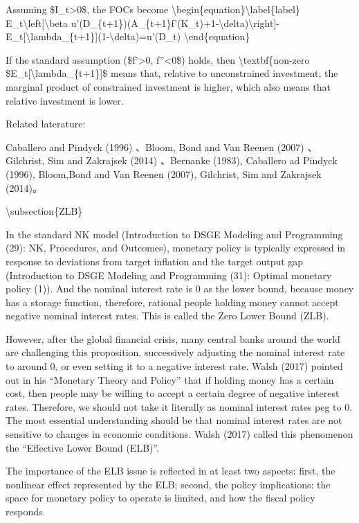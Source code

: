 \documentclass[10pt,math=newtx,citestyle=gb7714-2015,bibstyle=gb7714-2015]{elegantbook}
\begin{document}
	Assuming \$I\_t>0\$, the FOCs become
	\textbackslash{}begin\{equation\}\textbackslash{}label\{label\}
	E\_t\textbackslash{}left[\textbackslash{}beta u'(D\_\{t+1\})(A\_\{t+1\}f'(K\_t)+1-\textbackslash{}delta)\textbackslash{}right]-E\_t[\textbackslash{}lambda\_\{t+1\}](1-\textbackslash{}delta)=u'(D\_t)
	\textbackslash{}end\{equation\}
	
	If the standard assumption (\$f'>0, f''<0\$) holds, then \textbackslash{}textbf\{non-zero \$E\_t[\textbackslash{}lambda\_\{t+1\}]\$ means that, relative to unconstrained investment, the marginal product of constrained investment is higher, which also means that relative investment is lower.
	
	
	Related laterature:
	
	Caballero and Pindyck (1996) 、Bloom, Bond and Van Reenen (2007) 、Gilchrist, Sim and Zakrajsek (2014) 、Bernanke (1983), Caballero ad Pindyck (1996), Bloom,Bond and Van Reenen (2007), Gilchrist, Sim and Zakrajsek (2014)。
	
	
	\textbackslash{}subsection\{ZLB\}
	
	In the standard NK model (Introduction to DSGE Modeling and Programming (29): NK, Procedures, and Outcomes), monetary policy is typically expressed in response to deviations from target inflation and the target output gap (Introduction to DSGE Modeling and Programming (31): Optimal monetary policy (1)). And the nominal interest rate is 0 as the lower bound, because money has a storage function, therefore, rational people holding money cannot accept negative nominal interest rates. This is called the Zero Lower Bound (ZLB).
	
	However, after the global financial crisis, many central banks around the world are challenging this proposition, successively adjusting the nominal interest rate to around 0, or even setting it to a negative interest rate. Walsh (2017) pointed out in his ``Monetary Theory and Policy'' that if holding money has a certain cost, then people may be willing to accept a certain degree of negative interest rates. Therefore, we should not take it literally as nominal interest rates peg to 0. The most essential understanding should be that nominal interest rates are not sensitive to changes in economic conditions. Walsh (2017) called this phenomenon the ``Effective Lower Bound (ELB)''.
	
	The importance of the ELB issue is reflected in at least two aspects: first, the nonlinear effect represented by the ELB; second, the policy implications: the space for monetary policy to operate is limited, and how the fiscal policy responds.
	
\end{document}
